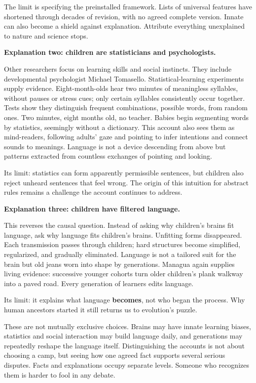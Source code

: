 The limit is specifying the preinstalled framework. Lists of universal features have shortened through decades of revision, with no agreed complete version. Innate can also become a shield against explanation. Attribute everything unexplained to nature and science stops.

\textbf{Explanation two: children are statisticians and psychologists.}

Other researchers focus on learning skills and social instincts. They include developmental psychologist Michael Tomasello. Statistical-learning experiments supply evidence. Eight-month-olds hear two minutes of meaningless syllables, without pauses or stress cues; only certain syllables consistently occur together. Tests show they distinguish frequent combinations, possible words, from random ones. Two minutes, eight months old, no teacher. Babies begin segmenting words by statistics, seemingly without a dictionary. This account also sees them as mind-readers, following adults' gaze and pointing to infer intentions and connect sounds to meanings. Language is not a device descending from above but patterns extracted from countless exchanges of pointing and looking.

Its limit: statistics can form apparently permissible sentences, but children also reject unheard sentences that feel wrong. The origin of this intuition for abstract rules remains a challenge the account continues to address.

\textbf{Explanation three: children have filtered language.}

This reverses the causal question. Instead of asking why children's brains fit language, ask why language fits children's brains. Unfitting forms disappeared. Each transmission passes through children; hard structures become simplified, regularized, and gradually eliminated. Language is not a tailored suit for the brain but old jeans worn into shape by generations. Managua again supplies living evidence: successive younger cohorts turn older children's plank walkway into a paved road. Every generation of learners edits language.

Its limit: it explains what language \textbf{becomes}, not who began the process. Why human ancestors started it still returns us to evolution's puzzle.

These are not mutually exclusive choices. Brains may have innate learning biases, statistics and social interaction may build language daily, and generations may repeatedly reshape the language itself. Distinguishing the accounts is not about choosing a camp, but seeing how one agreed fact supports several serious disputes. Facts and explanations occupy separate levels. Someone who recognizes them is harder to fool in any debate.

